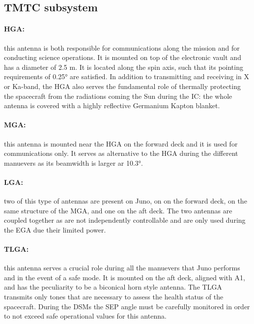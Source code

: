 \subsection{TMTC subsystem}
\label{subsec:tmtc_sub}

\paragraph{HGA:}this antenna is both responsible for communications along the mission and for conducting science operations. It is mounted on top of the electronic vault and has a diameter of 2.5 m. It is located along the spin axis, such that its pointing requirements of 0.25° are satisfied. In addition to transmitting and receiving in X or Ka-band, the HGA also serves the fundamental role of thermally protecting the spacecraft from the radiations coming the Sun during the IC: the whole antenna is covered with a highly reflective Germanium Kapton blanket. 

\vspace{-4mm}

\paragraph{MGA:}this antenna is mounted near the HGA on the forward deck and it is used for communications only. It serves as alternative to the HGA during the different manuevers as its beamwidth is larger ar 10.3°. 

\vspace{-4mm}

\paragraph{LGA:}two of this type of antennas are present on Juno, on on the forward deck, on the same structure of the MGA, and one on the aft deck. The two antennas are coupled together as are not independently controllable and are only used during the EGA due their limited power. 

\vspace{-4mm}

\paragraph{TLGA:}this antenna serves a crucial role during all the manuevers that Juno performs and in the event of a safe mode. It is mounted on the aft deck, aligned with A1, and has the peculiarity to be a biconical horn style antenna. The TLGA transmits only tones that are necessary to assess the health status of the spacecraft. During the DSMs the SEP angle must be carefully monitored in order to not exceed safe operational values for this antenna. 

